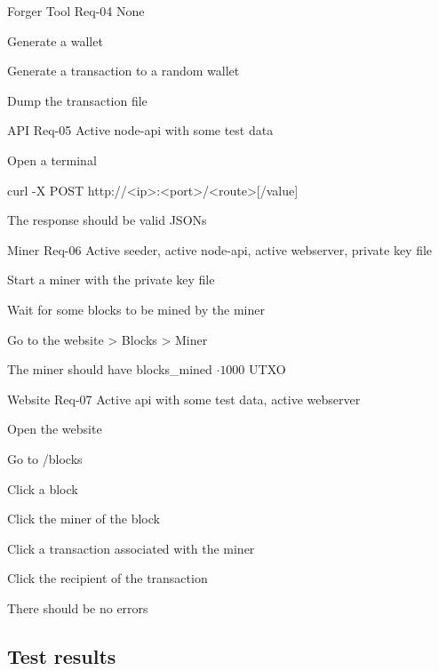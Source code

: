 \documentclass[../documentation.tex]{subfiles}
\begin{document}
    {Forger Tool}
    {Req-04}
    {None}
    {
        \item Generate a wallet
        \item Generate a transaction to a random wallet
        \item Dump the transaction file
    }

    {API}
    {Req-05}
    {Active node-api with some test data}
    {
        \item Open a terminal
        \item curl -X POST http://<ip>:<port>/<route>[/value]
        \item The response should be valid JSONs
    }

    {Miner}
    {Req-06}
    {Active seeder, active node-api, active webserver, private key file}
    {
        \item Start a miner with the private key file
        \item Wait for some blocks to be mined by the miner
        \item Go to the website > Blocks > Miner
        \item The miner should have blocks\_mined \(\cdot 1000\) UTXO
    }

    {Website}
    {Req-07}
    {Active api with some test data, active webserver}
    {
        \item Open the website
        \item Go to /blocks
        \item Click a block
        \item Click the miner of the block
        \item Click a transaction associated with the miner
        \item Click the recipient of the transaction
        \item There should be no errors
    }

\pagebreak

\subsection{Test results}
\end{document}
